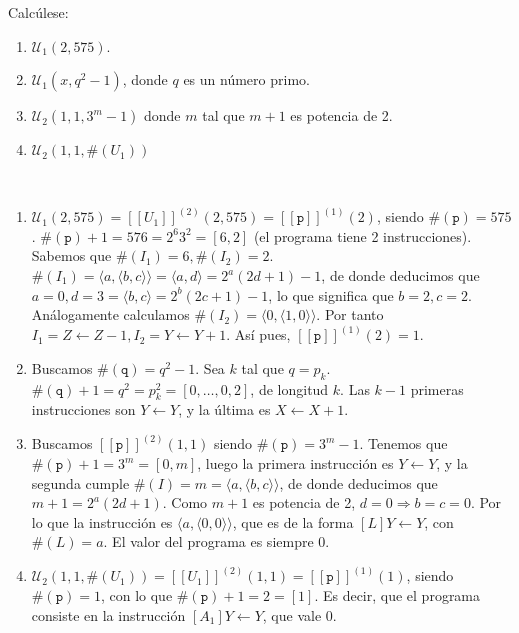 \documentclass[twoside]{article}
\begin{document}
\begin{ejercicio}{5}
Calcúlese:
\begin{enumerate}
\item $\mathcal{U}_1(2,575)$.
\item $\mathcal{U}_1(x,q^2-1)$, donde $q$ es un número primo.
\item $\mathcal{U}_2(1,1,3^m-1)$ donde $m$ tal que $m+1$ es potencia de 2.
\item $\mathcal{U}_2(1,1,\#(U_1))$ 
\end{enumerate}
\end{ejercicio}
\begin{solucion}\
\begin{enumerate}
\item  $\mathcal{U}_1(2,575)=[\![U_1]\!]^{(2)}(2,575)=[\![\texttt{p}]\!]^{(1)}(2)$, siendo $\#(\texttt{p})=575$. $\#(\texttt{p})+1=576=2^6 3^2=[6,2]$ (el programa tiene 2 instrucciones). Sabemos que $\#(I_1)=6,\#(I_2)=2$.$\#(I_1)=\langle a,\langle b,c\rangle\rangle=\langle a,d\rangle=2^a(2d+1)-1$, de donde deducimos que $a=0,d=3=\langle b,c\rangle=2^b(2c+1)-1$, lo que significa que $b=2,c=2$. Análogamente calculamos $\#(I_2)=\langle 0, \langle 1,0\rangle\rangle$. Por tanto $I_1=Z\leftarrow Z-1, I_2=Y\leftarrow Y+1$. Así pues, $[\![\texttt{p}]\!]^{(1)}(2)=1$. 
\item  Buscamos $\#(\texttt{q})=q^2-1$. Sea $k$ tal que $q=p_k$. $\#(\texttt{q})+1=q^2=p_k^2=[0,\dots,0,2]$, de longitud $k$. Las $k-1$ primeras instrucciones son $Y\leftarrow Y$, y la última es $X\leftarrow X+1$. 
\item  Buscamos $[\![\texttt{p}]\!]^{(2)}(1,1)$ siendo $\#(\texttt{p})=3^m-1$. Tenemos que $\#(\texttt{p})+1=3^m=[0,m]$, luego la primera instrucción es $Y\leftarrow Y$, y la segunda cumple $\#(I)=m=\langle a,\langle b,c\rangle\rangle$, de donde deducimos que $m+1=2^a(2d+1)$. Como $m+1$ es potencia de 2, $d=0\Rightarrow b=c=0$. Por lo que la instrucción es $\langle a,\langle 0,0\rangle\rangle$, que es de la forma $[L] Y\leftarrow Y$, con $\#(L)=a$. El valor del programa es siempre 0.
\item $\mathcal{U}_2(1,1,\#(U_1))=[\![U_1]\!]^{(2)}(1,1)=[\![\texttt{p}]\!]^{(1)}(1)$, siendo $\#(\texttt{p})=1$, con lo que $\#(\texttt{p})+1=2=[1]$. Es decir, que el programa consiste en la instrucción $[A_1] Y\leftarrow Y$, que vale 0.
\end{enumerate}
\end{solucion}
\end{document}
